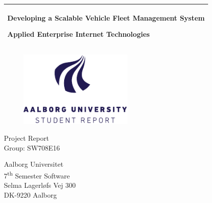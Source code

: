 %
\newcommand{\titlefont}{\sffamily\fontsize{36pt}{0pt}\selectfont}
\newcommand{\subtitlefont}{\sffamily\fontsize{26pt}{0pt}\selectfont}
\newcommand{\otherfont}{\sffamily\fontsize{18pt}{0pt}\selectfont}
\newcommand{\smallfont}{\sffamily\fontsize{12pt}{0pt}\selectfont}
\begin{titlepage}
    \addtolength{\hoffset}{0.5\evensidemargin-0.5\oddsidemargin} %
    \noindent%
    \begin{tabular}{@{}p{\textwidth}@{}}
        \toprule[2pt]
        \midrule
        \vspace{0.2cm}
        \begin{center}
        \titlefont Developing a Scalable Vehicle Fleet Management System
        \end{center}
    \vspace{0.1cm}
        \begin{center}
        \subtitlefont Applied Enterprise Internet Technologies
    \end{center}
        \vspace{0.2cm}\\
        \midrule
        \toprule[2pt]
    \end{tabular}
    \vspace{1.5 cm}
    \begin{figure}[h!]
        \centering
        \includegraphics[width=0.5\textwidth]{img/aau_logo_en.pdf}
    \end{figure}
    \vspace{1.5 cm}
    \begin{center}
        \otherfont
            Project Report
        \\
        \vspace{0.2cm}
        \otherfont
            Group: SW708E16
    \end{center}
    \vfill
    \begin{center}
    \smallfont
    Aalborg Universitet\\
    7\textsuperscript{th} Semester Software\\ \vspace{0.1cm}
    Selma Lagerløfs Vej 300\\
    DK-9220 Aalborg
    \end{center}
\end{titlepage}
\clearpage
\cleardoublepage
